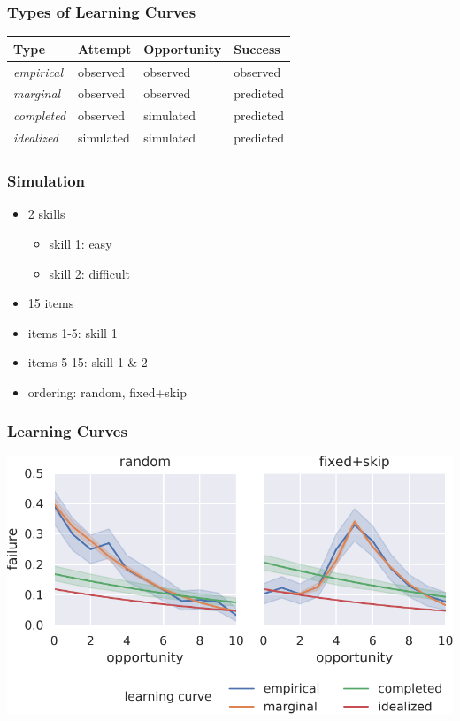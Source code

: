 \documentclass[bigger]{beamer}
\begin{document}
\begin{frame}
  \frametitle{Types of Learning Curves}

  \begin{center}
  \begin{tabular}{llll}
    \toprule
    Type & Attempt & Opportunity & Success\\
    \midrule
    {\it empirical} & observed  & observed  & observed\\
    {\it marginal}  & observed  & observed  & predicted\\
    {\it completed} & observed  & simulated & predicted\\
    {\it idealized} & simulated & simulated & predicted\\
    \bottomrule
  \end{tabular}    
  \end{center}
\end{frame}

\begin{frame}
  \frametitle{Simulation}

  \begin{itemize}
  \item 2 skills
    \begin{itemize}
    \item skill 1: easy
    \item skill 2: difficult
    \end{itemize}
  \item 15 items 
  \item items 1-5: skill 1
  \item items 5-15: skill 1 \& 2
  \item ordering: random, fixed+skip 
  \end{itemize}
\end{frame}

\begin{frame}
  \frametitle{Learning Curves}

  \includegraphics[width=\linewidth]{learning-curves-simulated-true-model}

\end{frame}
\end{document}
